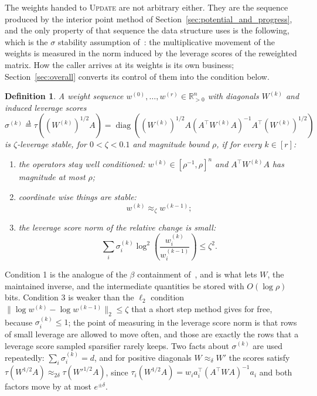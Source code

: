 \documentclass[11pt]{article}
\newtheorem{definition}{Definition}[section]
\newcommand{\R}{\mathbb R}
\newcommand{\diag}{\operatorname{diag}}
\newcommand{\defeq}{\stackrel{\Delta}{=}}
\begin{document}
The weights handed to \textsc{Update} are not arbitrary either.
They are the sequence produced by the interior point method of
Section~\ref{sec:potential_and_progress}, and the only property of that sequence
the data structure uses is the following, which is the $\sigma$ stability
assumption of~\cite[Definition 4]{LS15}: the multiplicative
movement of the weights is measured in the norm induced by the leverage scores
of the reweighted matrix.
How the caller arrives at its weights is its own business;
Section~\ref{sec:overall} converts its control of them into the condition below.

\begin{definition}
\label{def:tau_stable}
A weight sequence $w^{(0)}, \ldots, w^{(r)} \in \R^{n}_{>0}$ with diagonals
$W^{(k)}$ and induced leverage scores
\[
\sigma^{(k)}
\defeq
\tau\left( (W^{(k)})^{1/2} A \right)
=
\diag\left( (W^{(k)})^{1/2} A \left( A^\top W^{(k)} A \right)^{-1}
A^\top (W^{(k)})^{1/2} \right)
\]
is $\zeta$-leverage stable, for
$0 < \zeta < 0.1$ and magnitude bound
$\rho$, if for every
$k \in [r]$:
\begin{enumerate}
\item \label{itm:tau_stable:1} the operators stay well conditioned:
  $w^{(k)} \in [\rho^{-1}, \rho]^{n}$ and
  $A^\top W^{(k)} A$ has magnitude at most
  $\rho$;
\item \label{itm:tau_stable:2} coordinate wise things are stable:
\[
w^{(k)} \approx_{\zeta} w^{(k - 1)} ;
\]
\item \label{itm:tau_stable:3} the leverage score norm of the relative change is
  small:
\[
\sum_{i} \sigma^{(k)}_{i}
  \log^2\left( \frac{w^{(k)}_i}{w^{(k - 1)}_i}\right)
\le \zeta^2.
\]
\end{enumerate}
\end{definition}

Condition 1 is the analogue of the $\beta$ containment of~\cite[Definitions 3
and 4]{LS15}, and is what lets $W$, the maintained inverse, and
the intermediate quantities be stored with $O(\log \rho)$ bits.
Condition 3 is weaker than the $\ell_2$ condition
$\|\log w^{(k)} - \log w^{(k - 1)}\|_2 \le \zeta$ that a short step method gives
for free, because $\sigma^{(k)}_i \le 1$; the point of measuring in the leverage
score norm is that rows of small leverage are allowed to move often, and those
are exactly the rows that a leverage score sampled sparsifier rarely keeps.
Two facts about $\sigma^{(k)}$ are used repeatedly:
$\sum_i \sigma^{(k)}_i = d$, and for positive diagonals
$W \approx_{\delta} W'$ the scores satisfy
$\tau(W^{1/2} A) \approx_{2 \delta} \tau(W'^{1/2} A)$, since
$\tau_i(W^{1/2} A) = w_i a_i^\top (A^\top W A)^{-1} a_i$ and both factors move
by at most $e^{\pm \delta}$.
\end{document}
